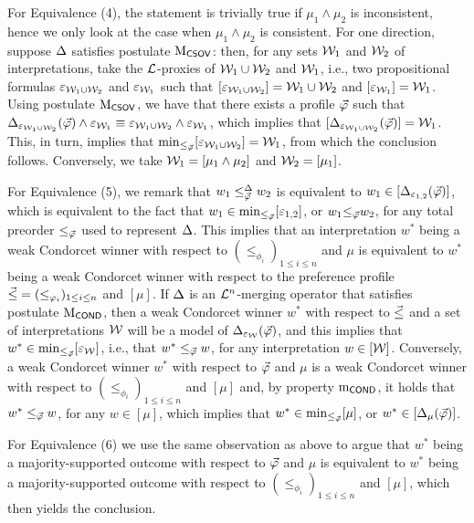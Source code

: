 \begin{prf*}{}{}
	For Equivalence (4), the statement is trivially true if $\mu_1\land\mu_2$ is inconsistent,
	hence we only look at the case when $\mu_1\land\mu_2$ is consistent.
	For one direction, suppose $\me$ satisfies postulate $\ppm{\CSOV}$:
	then, for any sets $\W_1$ and $\W_2$ of interpretations, take 
	the $\L$-proxies of $\W_1\cup\W_2$ and $\W_1$,
	i.e., two propositional formulas $\px_{\W_1\cup\W_2}$ and $\px_{\W_1}$ such that 
	$[\px_{\W_1\cup\W_2}]=\W_1\cup\W_2$ and $[\px_{\W_1}]=\W_1$.
	Using postulate $\ppm{\CSOV}$, we have that there exists a profile $\P$ 
	such that $\me_{\px_{\W_1\cup\W_2}}(\P)\land\px_{\W_1}\equiv \px_{\W_1\cup\W_2}\land\px_{\W_1}$,
	which implies that $[\me_{\px_{\W_1\cup\W_2}}(\P)]=\W_1$.
	This, in turn, implies that $\min_{\le_{\P}}[\px_{\W_1\cup\W_2}]=\W_1$,
	from which the conclusion follows.
	Conversely, we take $\W_1=[\mu_1\land\mu_2]$ and $\W_2=[\mu_1]$.

	For Equivalence (5), we remark that $w_1 \le^{\me}_{\P}w_2$
	is equivalent to $w_1\in[\me_{\px_{1,2}}(\P)]$, 
	which is equivalent to the fact that $w_1\in\min_{\le_{\P}}[\px_{1,2}]$,
	or $w_1{\le_{\P}}w_2$,
	for any total preorder $\le_{\P}$ used to represent $\me$.
	This implies that an interpretation $w^{\ast}$ being a weak Condorcet winner
	with respect to $(\le_{\phi_i})_{1\le i \le n}$ and $\mu$ is equivalent 
	to $w^{\ast}$ being a weak Condorcet winner with respect to the preference
	profile $\PP=(\le_{\phi_{i}})_{1\le i \le n}$ and $[\mu]$.
	If $\me$ is an $\L^{n}$-merging operator that satisfies postulate $\ppm{\COND}$,
	then a weak Condorcet winner $w^{\ast}$ with respect to $\PP$ and a set of interpretations 
	$\W$ will be a model of $\me_{\px_{\W}}(\P)$, and this implies that 
	$w^{\ast}\in\min_{\le_{\P}}[\px_{\W}]$,
	i.e., that $w^{\ast} \le_{\P} w$, for any interpretation $w\in[\W]$.
	Conversely, a weak Condorcet winner $w^{\ast}$ with respect to $\P$ and $\mu$
	is a weak Condorcet winner with respect to 
	$(\le_{\phi_i})_{1\le i \le n}$ and $[\mu]$ and, by property $\oom{\COND}$, it holds that 
	$w^{\ast}\le_{\P}w$, for any $w\in[\mu]$,
	which implies that $w^{\ast}\in\min_{\le_{\P}}[\mu]$,
	or $w^{\ast}\in[\me_{\mu}(\P)]$.

	For Equivalence (6) we use the same observation as above to argue that 
	$w^{\ast}$ being a majority-supported outcome with respect to $\P$ and $\mu$
	is equivalent to $w^{\ast}$ being a majority-supported outcome with respect 
	to $(\le_{\phi_i})_{1\le i \le n}$ and $[\mu]$, which then yields the conclusion.
\end{prf*}

